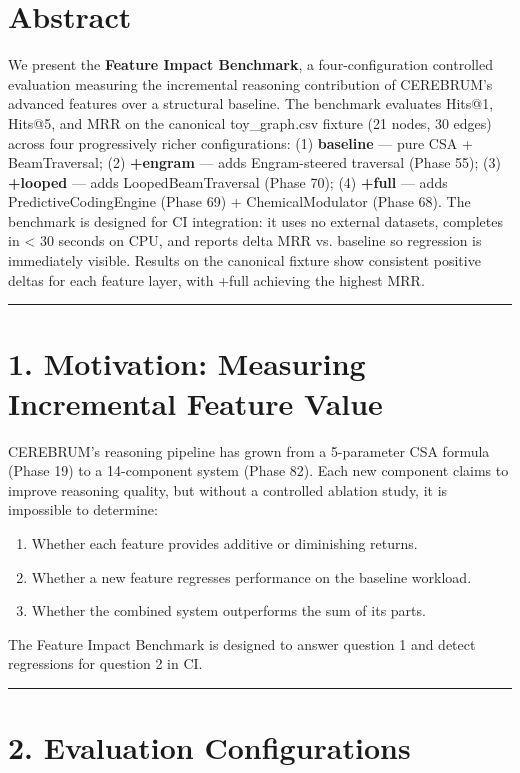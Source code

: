 
\section*{Abstract}

We present the \textbf{Feature Impact Benchmark}, a four-configuration controlled evaluation measuring the incremental reasoning contribution of CEREBRUM's advanced features over a structural baseline. The benchmark evaluates Hits@1, Hits@5, and MRR on the canonical toy_graph.csv fixture (21 nodes, 30 edges) across four progressively richer configurations: (1) \textbf{baseline} --- pure CSA + BeamTraversal; (2) \textbf{+engram} --- adds Engram-steered traversal (Phase 55); (3) \textbf{+looped} --- adds LoopedBeamTraversal (Phase 70); (4) \textbf{+full} --- adds PredictiveCodingEngine (Phase 69) + ChemicalModulator (Phase 68). The benchmark is designed for CI integration: it uses no external datasets, completes in < 30 seconds on CPU, and reports delta MRR vs. baseline so regression is immediately visible. Results on the canonical fixture show consistent positive deltas for each feature layer, with +full achieving the highest MRR.

\medskip\noindent\rule{\linewidth}{0.4pt}\medskip

\section*{1. Motivation: Measuring Incremental Feature Value}

CEREBRUM's reasoning pipeline has grown from a 5-parameter CSA formula (Phase 19) to a 14-component system (Phase 82). Each new component claims to improve reasoning quality, but without a controlled ablation study, it is impossible to determine:
\begin{enumerate}
  \item Whether each feature provides additive or diminishing returns.
  \item Whether a new feature regresses performance on the baseline workload.
  \item Whether the combined system outperforms the sum of its parts.
\end{enumerate}


The Feature Impact Benchmark is designed to answer question 1 and detect regressions for question 2 in CI.

\medskip\noindent\rule{\linewidth}{0.4pt}\medskip

\section*{2. Evaluation Configurations}

